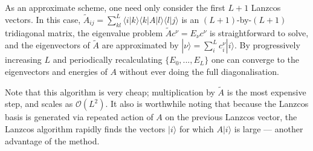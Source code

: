 \documentclass[10pt,a4paper,final]{article}
\newcommand{\bra}[1]{\langle #1|}
\newcommand{\braket}[2]{\langle #1|#2\rangle}
\newcommand{\ket}[1]{|#1\rangle}
\begin{document}
As an approximate scheme, one need only consider the first $L+1$ Lanzcos vectors. In this case, $\tilde A_{ij} = \sum^L_{kl}\braket{i}{k}\bra{k}A\ket{l}\braket{l}{j}$ is an $(L+1)$-by-$(L+1)$ tridiagonal matrix, the eigenvalue problem $\tilde Ac^\nu = E_\nu c^\nu$ is straightforward to solve, and the eigenvectors of $\tilde A$ are approximated by $\ket{\nu} = \sum_i^L c^\nu_i \ket{i}$. By progressively increasing $L$ and periodically recalculating $\{E_0,...,E_L\}$ one can converge to the eigenvectors and energies of $A$ without ever doing the full diagonalisation.

Note that this algorithm is very cheap; multiplication by $\tilde A$ is the most expensive step, and scales as $\mathcal{O}(L^2)$. It also is worthwhile noting that because the Lanzcos basis is generated via repeated action of $A$ on the previous Lanzcos vector, the Lanzcos algorithm rapidly finds the vectors $\ket{i}$ for which $A\ket{i}$ is large --- another advantage of the method.
\end{document}
